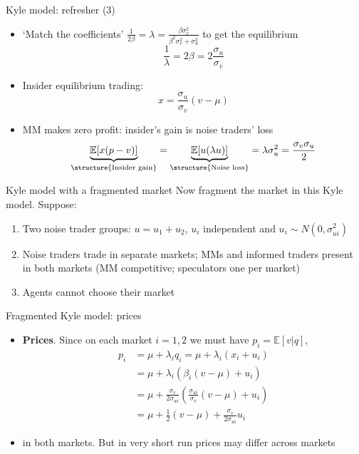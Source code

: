 \documentclass[english,10pt
,aspectratio=169
]{beamer}
\begin{document}
\begin{frame}{Kyle model: refresher (3)}
	\begin{itemize}
		\item `Match the coefficients' $\frac{1}{2\beta} = \lambda = \frac{\beta \sigma^{2}_{v}}{\beta^{2} \sigma^{2}_{v}+\sigma^{2}_{u}}$ to get the equilibrium
		\[
		\frac{1}{\lambda} = 2 \beta = 2 \frac{\sigma_{u}}{\sigma_{v}}
		\]
		\item Insider equilibrium trading:
		\[
		x = \frac{\sigma_{u}}{\sigma_{v}} (v-\mu)
		\]
		\item MM makes zero profit:  insider's gain is noise traders' loss
		\[
		\underbrace{\mathbb{E}[x(p-v)]}_{\structure{\text{Insider gain}}} = \underbrace{\mathbb{E}[u(\lambda u)]}_{\structure{\text{Noise loss}}} = \lambda \sigma^{2}_{u} = \frac{\sigma_{v}\sigma_{u}}{2}
		\]
	\end{itemize}
\end{frame}


\begin{frame}{Kyle model with a fragmented market}
	Now fragment the market in this Kyle model. Suppose:
	\begin{enumerate}
		\item Two noise trader groups: $u=u_{1}+u_{2}$, $u_i$ independent and $u_{i} \sim N(0, \sigma^{2}_{ui})$
		\item Noise traders trade in separate markets; MMs and informed traders present in both markets (MM competitive; speculators one per market)
		\item Agents cannot choose their market
	\end{enumerate}
\end{frame}


\begin{frame}{Fragmented Kyle model: prices}
	\begin{itemize}
		\item \textbf{Prices}.  Since on each market $i=1,2$ we must have $p_i=\mathbb{E}[v|q]$,
			\begin{align*}
				p_i &= \mu + \lambda_i q_i = \mu + \lambda_i (x_i + u_i)
				\\
				&= \mu + \lambda_i (\beta_i(v-\mu) + u_i)
				\\
				&= \mu + \frac{\sigma_v}{2 \sigma_{ui}} \left( \frac{\sigma_{ui}}{\sigma_v} (v-\mu) + u_i \right)
				\\
				&= \mu + \frac{1}{2}(v-\mu)+\frac{\sigma_v}{2\sigma_{ui}}u_i
			\end{align*}
		
		\item {} in both markets. But in very short run prices may differ across markets
	\end{itemize}
\end{frame}
\end{document}
